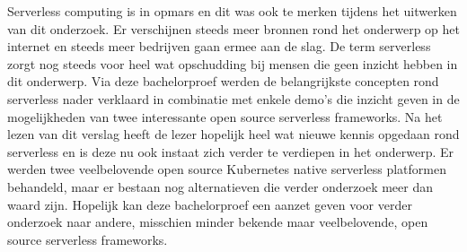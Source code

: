 Serverless computing is in opmars en dit was ook te merken tijdens het uitwerken van dit onderzoek. Er verschijnen steeds meer bronnen rond het onderwerp op het internet en steeds meer bedrijven gaan ermee aan de slag. De term serverless zorgt nog steeds voor heel wat opschudding bij mensen die geen inzicht hebben in dit onderwerp. Via deze bachelorproef werden de belangrijkste concepten rond serverless nader verklaard in combinatie met enkele demo's die inzicht geven in de mogelijkheden van twee interessante open source serverless frameworks. Na het lezen van dit verslag heeft de lezer hopelijk heel wat nieuwe kennis opgedaan rond serverless en is deze nu ook instaat zich verder te verdiepen in het onderwerp. Er werden twee veelbelovende open source Kubernetes native serverless platformen behandeld, maar er bestaan nog alternatieven die verder onderzoek meer dan waard zijn. Hopelijk kan deze bachelorproef een aanzet geven voor verder onderzoek naar andere, misschien minder bekende maar veelbelovende, open source serverless frameworks.